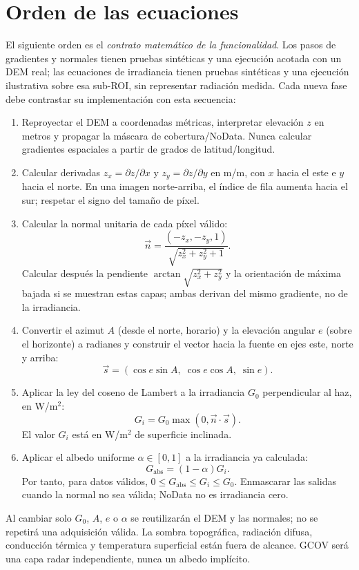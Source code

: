 \documentclass[11pt,a4paper]{article}
\begin{document}
\section{Orden de las ecuaciones}
El siguiente orden es el \emph{contrato matemático de la funcionalidad}. Los pasos de gradientes y normales tienen pruebas sintéticas y una ejecución acotada con un DEM real; las ecuaciones de irradiancia tienen pruebas sintéticas y una ejecución ilustrativa sobre esa sub-ROI, sin representar radiación medida. Cada nueva fase debe contrastar su implementación con esta secuencia:
\begin{enumerate}
  \item Reproyectar el DEM a coordenadas métricas, interpretar elevación $z$ en metros y propagar la máscara de cobertura/NoData. Nunca calcular gradientes espaciales a partir de grados de latitud/longitud.
  \item Calcular derivadas $z_x=\partial z/\partial x$ y $z_y=\partial z/\partial y$ en m/m, con $x$ hacia el este e $y$ hacia el norte. En una imagen norte-arriba, el índice de fila aumenta hacia el sur; respetar el signo del tamaño de píxel.
  \item Calcular la normal unitaria de cada píxel válido:
  \begin{equation}
    \vec n=\frac{(-z_x,-z_y,1)}{\sqrt{z_x^2+z_y^2+1}}.
  \end{equation}
  Calcular después la pendiente $\arctan\sqrt{z_x^2+z_y^2}$ y la orientación de máxima bajada si se muestran estas capas; ambas derivan del mismo gradiente, no de la irradiancia.
  \item Convertir el azimut $A$ (desde el norte, horario) y la elevación angular $e$ (sobre el horizonte) a radianes y construir el vector hacia la fuente en ejes este, norte y arriba:
  \begin{equation}
    \vec s=(\cos e\sin A,\;\cos e\cos A,\;\sin e).
  \end{equation}
  \item Aplicar la ley del coseno de Lambert a la irradiancia $G_0$ perpendicular al haz, en W/m$^2$:
  \begin{equation}
    G_i=G_0\max(0,\vec n\cdot\vec s).
  \end{equation}
  El valor $G_i$ está en W/m$^2$ de superficie inclinada.
  \item Aplicar el albedo uniforme $\alpha\in[0,1]$ a la irradiancia ya calculada:
  \begin{equation}
    G_{\mathrm{abs}}=(1-\alpha)G_i.
  \end{equation}
  Por tanto, para datos válidos, $0\leq G_{\mathrm{abs}}\leq G_i\leq G_0$. Enmascarar las salidas cuando la normal no sea válida; NoData no es irradiancia cero.
\end{enumerate}
Al cambiar solo $G_0$, $A$, $e$ o $\alpha$ se reutilizarán el DEM y las normales; no se repetirá una adquisición válida. La sombra topográfica, radiación difusa, conducción térmica y temperatura superficial están fuera de alcance. GCOV será una capa radar independiente, nunca un albedo implícito.
\end{document}

